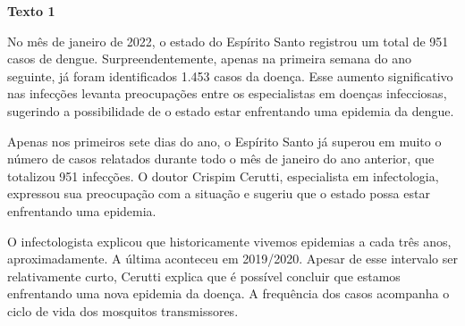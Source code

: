 \begin{myquote}





\textbf{Texto 1}

No mês de janeiro de 2022, o estado do Espírito Santo registrou um
total de 951 casos de dengue. Surpreendentemente, apenas na primeira semana do
ano seguinte, já foram identificados 1.453 casos da doença. Esse aumento
significativo nas infecções levanta preocupações entre os especialistas em
doenças infecciosas, sugerindo a possibilidade de o estado estar enfrentando
uma epidemia da dengue.

Apenas nos primeiros sete dias do ano, o Espírito Santo já superou em muito o
número de casos relatados durante todo o mês de janeiro do ano anterior, que
totalizou 951 infecções. O doutor Crispim Cerutti, especialista em
infectologia, expressou sua preocupação com a situação e sugeriu que o estado
possa estar enfrentando uma epidemia.

O infectologista explicou que historicamente vivemos epidemias a
cada três anos, aproximadamente. A última aconteceu em 2019/2020.
Apesar de esse intervalo ser relativamente curto, Cerutti explica que 
é possível concluir que estamos enfrentando uma nova epidemia da doença. 
A frequência dos casos acompanha o ciclo de vida dos mosquitos transmissores.

\end{myquote}


